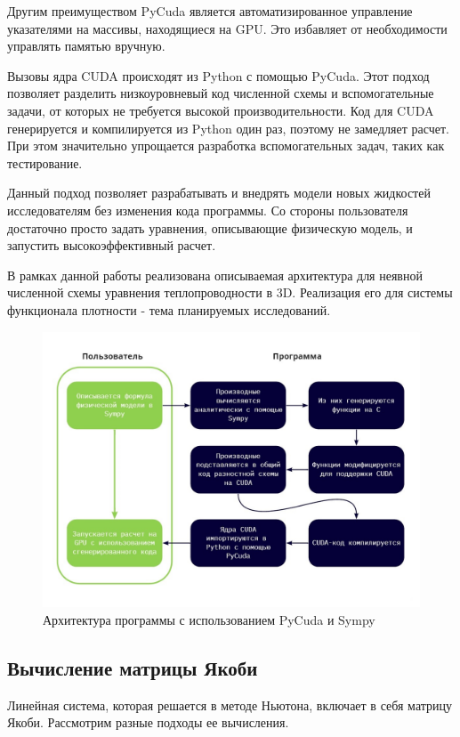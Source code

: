Другим преимуществом PyCuda является автоматизированное управление указателями на массивы, находящиеся на GPU. Это избавляет от необходимости управлять памятью вручную. 
\par
Вызовы ядра CUDA происходят из Python с помощью PyCuda. Этот подход позволяет разделить низкоуровневый код численной схемы и вспомогательные задачи, от которых не требуется высокой производительности. Код для CUDA генерируется и компилируется из Python один раз, поэтому не замедляет расчет. 
При этом значительно упрощается разработка вспомогательных задач, таких как тестирование.
\par
Данный подход позволяет разрабатывать и внедрять модели новых жидкостей исследователям без изменения кода программы. Со стороны пользователя достаточно просто задать уравнения, описывающие физическую модель, и запустить высокоэффективный расчет.
\par
В рамках данной работы реализована описываемая архитектура для неявной численной схемы уравнения теплопроводности в 3D. Реализация его для системы функционала плотности - тема планируемых исследований.
\begin{figure}[H]
\centering
\includegraphics[width=\textwidth]{common_images/CUDA_architecture.jpg}
\caption{Архитектура программы с использованием PyCuda и Sympy}
\label{fig:cuda_architecture}
\end{figure}


\subsection{Вычисление матрицы Якоби \label{methods:computing_jacobi}}
Линейная система, которая решается в методе Ньютона, включает в себя матрицу Якоби. Рассмотрим разные подходы ее вычисления.

